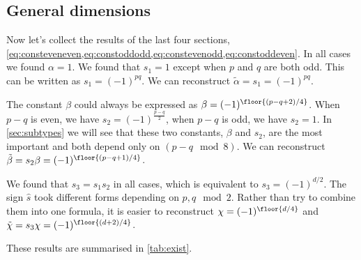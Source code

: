 \documentclass[11pt]{article}
\newcommand{\alphat}{\tilde{\alpha}}
\newcommand{\betat}{\tilde{\beta}}
\newcommand{\chit}{\tilde{\chi}}
\begin{document}

\subsection{General dimensions}\label{sec:constgendim}

Now let's collect the results of the last four sections,
\cref{eq:consteveneven,eq:constoddodd,eq:constevenodd,eq:constoddeven}.
In all cases we found $\alpha = 1$.
We found that $s_1 = 1$ except when $p$ and $q$ are both odd.
This can be written as $s_1 = (-1)^{pq}$.
We can reconstruct $\alphat = s_1 = (-1)^{pq}$.

The constant $\beta$ could always be expressed as $\beta = (-1)^{\floor{(p-q+2)/4}}$.
When $p-q$ is even, we have $s_2 = (-1)^{\frac{p-q}{2}}$, when $p-q$ is odd, we have $s_2 = 1$.
In \cref{sec:subtypes} we will see that these two constants, $\beta$ and $s_2$, are the most important and both depend only on
\( (p - q \mod 8) \).
We can reconstruct $\betat = s_2 \beta = (-1)^{\floor{(p-q+1)/4}}$.

We found that $s_3 = s_1 s_2$ in all cases, which is equivalent to $s_3 = (-1)^{d/2}$.
The sign $\hat{s}$ took different forms depending on $p,q \mod 2$.
Rather than try to combine them into one formula, it is easier to reconstruct $\chi = (-1)^{\floor{d/4}}$ and $\chit = s_3 \chi = (-1)^{\floor{(d+2)/4}}$.

These results are summarised in \cref{tab:exist}.
\end{document}
